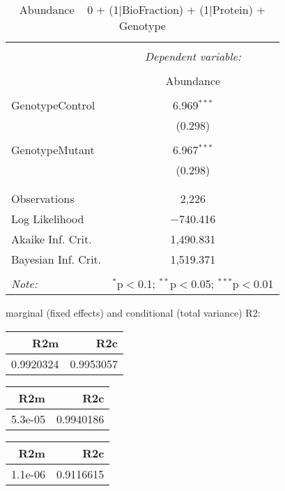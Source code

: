 \documentclass[11pt]{report}
\begin{document}
\begin{table}[!htbp] \centering 
  \caption{Abundance ~ 0 + (1|BioFraction) + (1|Protein) + Genotype} 
  \label{} 
\begin{tabular}{@{\extracolsep{5pt}}lc} 
\\[-1.8ex]\hline 
\hline \\[-1.8ex] 
 & \multicolumn{1}{c}{\textit{Dependent variable:}} \\ 
\cline{2-2} 
\\[-1.8ex] & Abundance \\ 
\hline \\[-1.8ex] 
 GenotypeControl & 6.969$^{***}$ \\ 
  & (0.298) \\ 
  & \\ 
 GenotypeMutant & 6.967$^{***}$ \\ 
  & (0.298) \\ 
  & \\ 
\hline \\[-1.8ex] 
Observations & 2,226 \\ 
Log Likelihood & $-$740.416 \\ 
Akaike Inf. Crit. & 1,490.831 \\ 
Bayesian Inf. Crit. & 1,519.371 \\ 
\hline 
\hline \\[-1.8ex] 
\textit{Note:}  & \multicolumn{1}{r}{$^{*}$p$<$0.1; $^{**}$p$<$0.05; $^{***}$p$<$0.01} \\ 
\end{tabular} 
\end{table} 
marginal (fixed effects) and conditional (total variance) R2:

\begin{tabular}{r|r}
\hline
R2m & R2c\\
\hline
0.9920324 & 0.9953057\\
\hline
\end{tabular}

\begin{tabular}{r|r}
\hline
R2m & R2c\\
\hline
5.3e-05 & 0.9940186\\
\hline
\end{tabular}

\begin{tabular}{r|r}
\hline
R2m & R2c\\
\hline
1.1e-06 & 0.9116615\\
\hline
\end{tabular}
\end{document}
